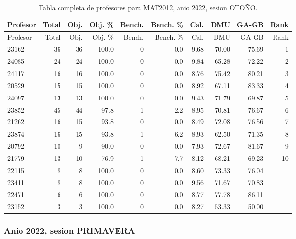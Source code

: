 \begingroup
\scriptsize
\setlength{\tabcolsep}{3pt}
\begin{longtable}{lrrrrrrrrr}
\caption{Tabla completa de profesores para MAT2012, anio 2022, sesion OTOÑO.}\label{tab:prof-period-mat2012-2022-oto-o}\\
\toprule
Profesor & Total & Obj. & Obj. \% & Bench. & Bench. \% & Cal. & DMU & GA-GB & Rank \\
\midrule
\endfirsthead
\toprule
Profesor & Total & Obj. & Obj. \% & Bench. & Bench. \% & Cal. & DMU & GA-GB & Rank \\
\midrule
\endhead
23162 & 36 & 36 & 100.0 & 0 & 0.0 & 9.68 & 70.00 & 75.69 & 1 \\
24085 & 24 & 24 & 100.0 & 0 & 0.0 & 9.84 & 65.28 & 72.22 & 2 \\
24117 & 16 & 16 & 100.0 & 0 & 0.0 & 8.76 & 75.42 & 80.21 & 3 \\
20529 & 15 & 15 & 100.0 & 0 & 0.0 & 8.92 & 67.11 & 83.33 & 4 \\
24097 & 13 & 13 & 100.0 & 0 & 0.0 & 9.43 & 71.79 & 69.87 & 5 \\
23852 & 45 & 44 & 97.8 & 1 & 2.2 & 8.95 & 70.81 & 76.67 & 6 \\
21262 & 16 & 15 & 93.8 & 0 & 0.0 & 8.49 & 72.08 & 76.56 & 7 \\
23874 & 16 & 15 & 93.8 & 1 & 6.2 & 8.93 & 62.50 & 71.35 & 8 \\
20792 & 10 & 9 & 90.0 & 0 & 0.0 & 7.93 & 72.67 & 81.67 & 9 \\
21779 & 13 & 10 & 76.9 & 1 & 7.7 & 8.12 & 68.21 & 69.23 & 10 \\
22115 & 8 & 8 & 100.0 & 0 & 0.0 & 8.60 & 73.33 & 76.04 &  \\
23411 & 8 & 8 & 100.0 & 0 & 0.0 & 9.56 & 71.67 & 70.83 &  \\
22471 & 6 & 6 & 100.0 & 0 & 0.0 & 8.77 & 77.78 & 86.11 &  \\
23152 & 3 & 3 & 100.0 & 0 & 0.0 & 8.27 & 53.33 & 50.00 &  \\
\bottomrule
\end{longtable}
\endgroup

\subsubsection{Anio 2022, sesion PRIMAVERA}

